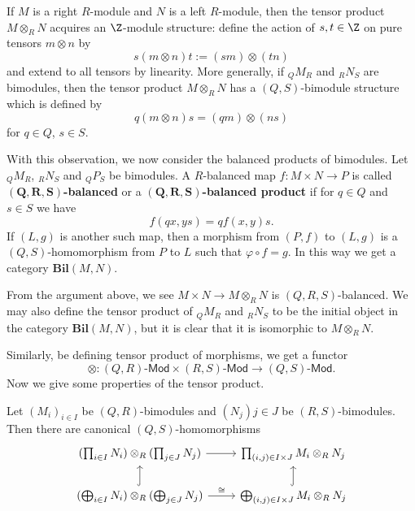 If $M$ is a right $R$-module and $N$ is a left $R$-module, then the tensor product $M\otimes_{R}N$ acquires an $\Z$-module structure: define the action of $s,t\in\Z$ on pure tensors $m\otimes n$ by
\[s(m\otimes n)t:=(sm)\otimes(tn)\]
and extend to all tensors by linearity. More generally, if $_{Q}M_{R}$ and $_{R}N_{S}$ are bimodules, then the tensor product $M\otimes_RN$ has a $(Q,S)$-bimodule structure which is defined by
\[q(m\otimes n)s=(qm)\otimes(ns)\]
for $q\in Q$, $s\in S$.\par
With this observation, we now consider the balanced products of bimodules. Let $_{Q}M_{R}$, $_{R}N_{S}$ and $_{Q}P_{S}$ be bimodules. A $R$-balanced map $f:M\times N\to P$ is called \textbf{$\bm{(Q,R,S)}$-balanced} or a \textbf{$\bm{(Q,R,S)}$-balanced product} if for $q\in Q$ and $s\in S$ we have
\[f(qx,ys)=qf(x,y)s.\]
If $(L,g)$ is another such map, then a morphism from $(P,f)$ to $(L,g)$ is a $(Q,S)$-homomorphism from $P$ to $L$ such that $\varphi\circ f=g$. In this way we get a category $\mathbf{Bil}(M,N)$.\par
From the argument above, we see $M\times N\to M\otimes_RN$ is $(Q,R,S)$-balanced. We may also define the tensor product of $_{Q}M_{R}$ and $_{R}N_{S}$ to be the initial object in the category $\mathbf{Bil}(M,N)$, but it is clear that it is isomorphic to $M\otimes_RN$.\par
Similarly, be defining tensor product of morphisms, we get a functor
\[\otimes:(Q,R)\text{-}\mathsf{Mod}\times(R,S)\text{-}\mathsf{Mod}\to(Q,S)\text{-}\mathsf{Mod}.\]
Now we give some properties of the tensor product.
\begin{proposition}
Let $(M_i)_{i\in I}$ be $(Q,R)$-bimodules and $(N_j){j\in J}$ be $(R,S)$-bimodules. Then there are canonical $(Q,S)$-homomorphisms
\[\begin{tikzcd}
(\prod_{i\in I}N_i)\otimes_R(\prod_{j\in J}N_j)\ar[r]&\prod_{(i,j)\in I\times J}M_i\otimes_RN_j\\
(\bigoplus_{i\in I}N_i)\otimes_R(\bigoplus_{j\in J}N_j)\ar[u,hook]\ar[r,"\cong"]&\bigoplus_{(i,j)\in I\times J}M_i\otimes_RN_j\ar[u,hook]
\end{tikzcd}\]
\end{proposition}
